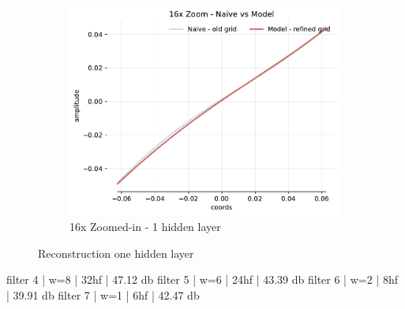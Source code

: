 \begin{figure}[!h]
\begin{subfigure}[b]{0.32\textwidth}
        \centering
        \includegraphics[width=\textwidth]{img/ch3/16x-6hf-1hl-1w-sub7.pdf}
        \caption{16x Zoomed-in - 1 hidden layer}
    \end{subfigure}
    \caption{Reconstruction one hidden layer}
    \label{f:rec-deep-multiple-filters}
\end{figure}


filter 4 | w=8  | 32hf | 47.12 db
filter 5 | w=6 | 24hf | 43.39 db
filter 6 | w=2 | 8hf | 39.91 db
filter 7 | w=1 | 6hf | 42.47 db